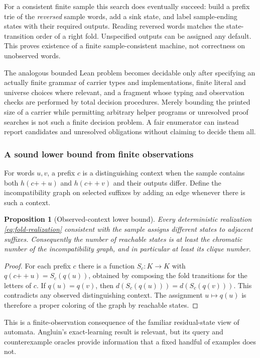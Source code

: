 \documentclass[11pt,a4paper]{article}
\newcommand{\app}{\mathbin{+\!+}}
\newtheorem{proposition}{Proposition}[section]
\theoremstyle{remark}
\begin{document}
For a consistent finite sample this search does eventually succeed: build a
prefix trie of the \emph{reversed} sample words, add a sink state, and label
sample-ending states with their required outputs. Reading reversed words
matches the state-transition order of a right fold. Unspecified outputs can
be assigned any default. This proves existence of a finite sample-consistent
machine, not correctness on unobserved words.

The analogous bounded Lean problem becomes decidable only after specifying
an actually finite grammar of carrier types and implementations, finite
literal and universe choices where relevant, and a fragment whose typing
and observation checks are performed by total decision procedures. Merely
bounding the printed size of a carrier while permitting arbitrary helper
programs or unresolved proof searches is not such a finite decision problem.
A fair enumerator can instead report candidates and unresolved obligations
without claiming to decide them all.

\subsubsection*{A sound lower bound from finite observations}

For words $u,v$, a prefix $c$ is a distinguishing context when the sample
contains both $h(c\app u)$ and $h(c\app v)$ and their outputs differ. Define
the incompatibility graph on selected suffixes by adding an edge whenever
there is such a context.

\begin{proposition}[Observed-context lower bound]\label{prop:carrier-bound}
Every deterministic realization \eqref{eq:fold-realization} consistent with
the sample assigns different states to adjacent suffixes. Consequently the
number of reachable states is at least the chromatic number of the
incompatibility graph, and in particular at least its clique number.
\end{proposition}
\begin{proof}
For each prefix $c$ there is a function $S_c:K\to K$ with
$q(c\app u)=S_c(q(u))$, obtained by composing the fold transitions for the
letters of $c$. If $q(u)=q(v)$, then
$d(S_c(q(u)))=d(S_c(q(v)))$. This contradicts any observed distinguishing
context. The assignment $u\mapsto q(u)$ is therefore a proper coloring of
the graph by reachable states.
\end{proof}

This is a finite-observation consequence of the familiar residual-state view
of automata. Angluin's exact-learning result is relevant, but its query and
counterexample oracles provide information that a fixed handful of examples
does not.\cite{angluin}
\end{document}
